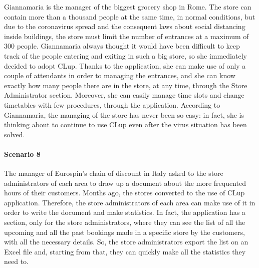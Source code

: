 \documentclass[table, 12pt]{article}
\begin{document}
Giannamaria is the manager of the biggest grocery shop in Rome. The store can contain more than a thousand people at the same time, in normal conditions, but due to the coronavirus spread and the consequent laws about social distancing inside buildings, the store must limit the number of entrances at a maximum of 300 people. Giannamaria always thought it would have been difficult to keep track of the people entering and exiting in such a big store, so she immediately decided to adopt CLup. Thanks to the application, she can make use of only a couple of attendants in order to managing the entrances, and she can know exactly how many people there are in the store, at any time, through the Store Administrator section. Moreover, she can easily manage time slots and change timetables with few procedures, through the application. According to Giannamaria, the managing of the store has never been so easy: in fact, she is thinking about to continue to use CLup even after the virus situation has been solved.


\paragraph{Scenario 8}

The manager of Eurospin's chain of discount in Italy asked to the store administrators of each area to draw up a document about the more frequented hours of their customers. Months ago, the stores converted to the use of CLup application. Therefore, the store administrators of each area can make use of it in order to write the document and make statistics. In fact, the application has a section, only for the store administrators, where they can see the list of all the upcoming and all the past bookings made in a specific store by the customers, with all the necessary details. So, the store administrators export the list on an Excel file and, starting from that, they can quickly make all the statistics they need to.
\end{document}
